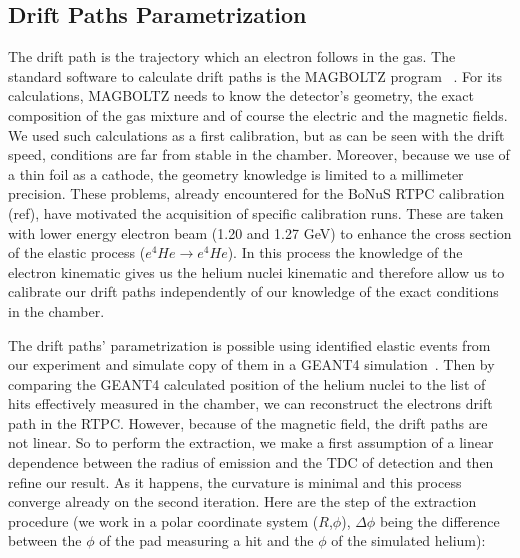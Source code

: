 \documentclass[aps,prl,twocolumn,showpacs,superscriptaddress,groupedaddress]{revtex4}
\begin{document}
   
\subsection{Drift Paths Parametrization}

The drift path is the trajectory which an electron follows in the gas. The standard software to calculate drift paths is the MAGBOLTZ program ~\cite{MAGBOLTZ}. For its calculations, MAGBOLTZ needs to know the detector's geometry, the exact composition of the gas mixture and of course the electric and the magnetic fields. We used such calculations as a first calibration, but as can be seen with the drift speed, conditions are far from stable in the chamber. Moreover, because we use of a thin foil as a cathode, the geometry knowledge is limited to a millimeter precision. These problems, already encountered for the BoNuS RTPC calibration (ref), have motivated the acquisition of specific calibration runs. These are taken with lower energy electron beam (1.20 and 1.27 GeV) to enhance the cross section of the elastic process ($e ^{4}He \rightarrow e ^{4}He$). In this process the knowledge of the electron kinematic gives us the helium nuclei kinematic and therefore allow us to calibrate our drift paths independently of our knowledge of the exact conditions in the chamber.

The drift paths' parametrization is possible using identified elastic events from our experiment and simulate copy of them in a GEANT4 simulation~\cite{GEANT4}. Then by comparing the GEANT4 calculated position of the helium nuclei to the list of hits effectively measured in the chamber, we can reconstruct the electrons drift path in the RTPC. However, because of the magnetic field, the drift paths are not linear. So to perform the extraction, we make a first assumption of a linear dependence between the radius of emission and the TDC of detection and then refine our result. As it happens, the curvature is minimal and this process converge already on the second iteration. Here are the step of the extraction procedure (we work in a polar coordinate system ($R$,$\phi$), $\Delta\phi$ being the difference between the $\phi$ of the pad measuring a hit and the $\phi$ of the simulated helium):
\end{document}
